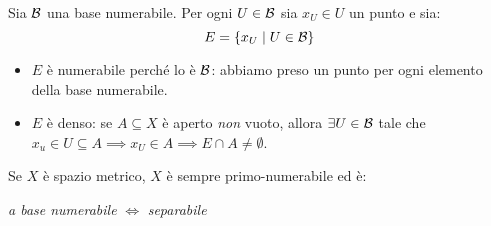 \begin{demonstration}
	Sia $\mathcal{B}$ una base numerabile. Per ogni $U\in\mathcal{B}$ sia $x_U\in U$ un punto e sia:
	\begin{equation*}
		E=\left\{x_U\mid U\in \mathcal{B}\right\}
	\end{equation*}
\begin{itemize}
	\item $E$ è numerabile perché lo è $\mathcal{B}$: abbiamo preso un punto per ogni elemento della base numerabile.
	\item $E$ è denso: se $A\subseteq X$ è aperto \textit{non} vuoto, allora $\exists U\in\mathcal{B}$ tale che $x_u\in U\subseteq A\implies x_U\in A\implies E\cap A\neq \emptyset$.
\end{itemize}
\end{demonstration}
\begin{proposition}
	Se $X$ è spazio metrico, $X$ è sempre primo-numerabile ed è:
	\begin{center}
		\textit{a base numerabile} $\iff$ \textit{separabile}
	\end{center}
\vspace{-8mm}
\end{proposition}
